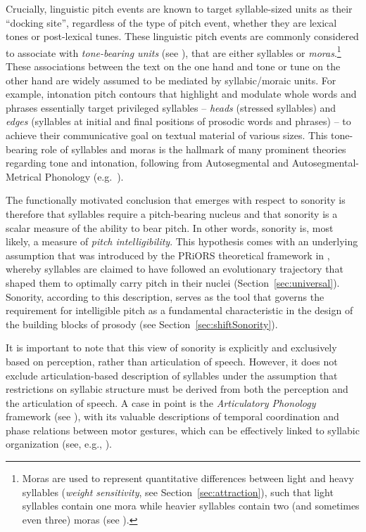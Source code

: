 Crucially, linguistic pitch events are known to target syllable-sized units as their \enquote{docking site}, regardless of the type of pitch event, whether they are lexical tones or post-lexical tunes.
These linguistic pitch events are commonly considered to associate with \emph{tone-bearing units} (see \citealt{leben1973suprasegmental}), that are either syllables or \emph{moras}.\footnote{Moras are used to represent quantitative differences between light and heavy syllables (\emph{weight sensitivity}, see Section~\ref{sec:attraction}), such that light syllables contain one mora while heavier syllables contain two (and sometimes even three) moras (see \citealt{hyman1984atheory, hayes1989compensatory, ito1989prosodic, mccarthy1990footsk, zec1995sonority, zec2003prosodic}).}
These associations between the text on the one hand and tone or tune on the other hand are widely assumed to be mediated by syllabic/moraic units.
For example, intonation pitch contours that highlight and modulate whole words and phrases essentially target privileged syllables -- \emph{heads} (stressed syllables) and \emph{edges} (syllables at initial and final positions of prosodic words and phrases) -- to achieve their communicative goal on textual material of various sizes.
This tone-bearing role of syllables and moras is the hallmark of many prominent theories regarding tone and intonation, following from Autosegmental and Autosegmental-Metrical Phonology (e.g.~\citealt{liberman1975intonationalsk, goldsmith1976autosegmental, ladd2008intonational, pierrehumbert1980phoneticssk}).

The functionally motivated conclusion that emerges with respect to sonority is therefore that syllables require a pitch-bearing nucleus and that sonority is a scalar measure of the ability to bear pitch. In other words, sonority is, most likely, a measure of \emph{pitch intelligibility}.
This hypothesis comes with an underlying assumption that was introduced by the PRiORS theoretical framework in ,
whereby syllables are claimed to have followed an evolutionary trajectory that shaped them to optimally carry pitch in their nuclei (Section~\ref{sec:universal}). Sonority, according to this description, serves as the tool that governs the requirement for intelligible pitch as a fundamental characteristic in the design of the building blocks of prosody (see Section~\ref{sec:shiftSonority}).

It is important to note that this view of sonority is explicitly and exclusively based on perception, rather than articulation of speech. However, it does not exclude articulation-based description of syllables under the assumption that restrictions on syllabic structure must be derived from both the perception and the articulation of speech. A case in point is the \emph{Articulatory Phonology} framework
(see ),
with its valuable descriptions of temporal coordination and phase relations between motor gestures, which can be effectively linked to syllabic organization (see, e.g., \citealt{goldstein2007syllablesk, gafos2014stochastic, goldstein2009coupled, hermes2017variabilitysk, shaw2009syllabificationsk}).

